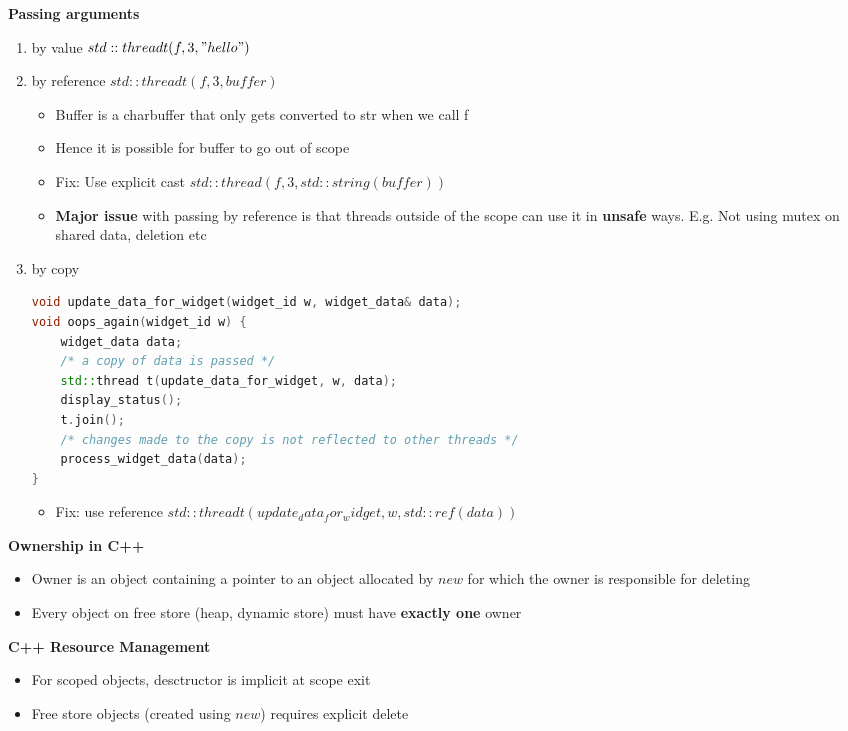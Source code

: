 \documentclass[10pt, landscape]{article}
\begin{document}
\begin{multicols}{4}
\textbf{Passing arguments} \\
\begin{enumerate}
    \item by value $std::thread t(f, 3, "hello")$
    \item by reference $std::thread t(f, 3, buffer)$
    \begin{itemize}
        \item Buffer is a charbuffer that only gets converted to str when we call f
        \item Hence it is possible for buffer to go out of scope 
        \item Fix: Use explicit cast $std::thread(f, 3, std::string(buffer))$ 
        \item \textbf{Major issue} with passing by reference is that threads outside of the scope can use it in \textbf{unsafe} ways. E.g. Not using mutex on shared data, deletion etc 
    \end{itemize}

    \item by copy
    \begin{lstlisting}[language=c++, breaklines=true, breakatwhitespace=true]
void update_data_for_widget(widget_id w, widget_data& data);
void oops_again(widget_id w) {
    widget_data data;
    /* a copy of data is passed */
    std::thread t(update_data_for_widget, w, data);
    display_status();
    t.join();
    /* changes made to the copy is not reflected to other threads */
    process_widget_data(data);
}
    \end{lstlisting}
    \begin{itemize}
        \item Fix: use reference $std::thread t(update_data_for_widget, w, std::ref(data))$
    \end{itemize} 
\end{enumerate}



\textbf{Ownership in C++} \\ 
\begin{itemize}
    \item Owner is an object containing a pointer to an object allocated by $new$ for which the owner is responsible for deleting
    \item Every object on free store (heap, dynamic store) must have \textbf{exactly one} owner
\end{itemize}

\textbf{C++ Resource Management} \\ 
\begin{itemize}
    \item For scoped objects, desctructor is implicit at scope exit 
    \item Free store objects (created using $new$) requires explicit delete
\end{itemize}



\end{multicols}
\end{document}
